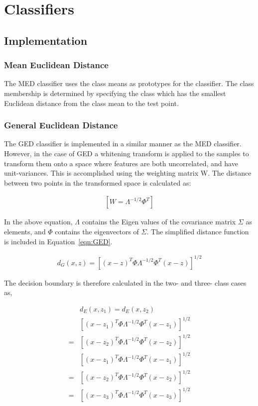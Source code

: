 \section{Classifiers}

\subsection{Implementation}

\subsubsection{Mean Euclidean Distance}

The MED classifier uses the class means as prototypes for the classifier. The class membership is determined by specifying the class which has the smallest Euclidean distance from the class mean to the test point.

\subsubsection{General Euclidean Distance}
The GED classifier is implemented in a similar manner as the MED classifier. However, in the case of GED a whitening transform is applied to the samples to transform them onto a space where features are both uncorrelated, and have unit-variances. This is accomplished using the weighting matrix W. The distance between two points in the transformed space is calculated as:


\begin{eqnarray}
\label{eqn:GED-whitening}
\left [ W=\Lambda^{-1/2}\Phi^{T}  \right ]
\end{eqnarray}



In the above equation, $\Lambda$ contains the Eigen values of the covariance matrix $\Sigma$ as elements, and $\Phi$ contains the eigenvectors of $\Sigma$. The simplified distance function is included in Equation~\ref{eqn:GED}.

\begin{eqnarray}
\label{eqn:GED}
{d}_{G}(x,z) = {\left [ (x-z)^{T}\Phi\Lambda^{-1/2}\Phi^{T}(x-z) \right ]}^{1/2}
\end{eqnarray}


The decision boundary is therefore calculated in the two- and three- class cases as,

\begin{eqnarray}
\label{eqn:boundary-GED}
& d_{E} (x,z_{1}) = d_{E} (x,z_{2}) \\
& \left [ (x-{z}_{1})^{T}\Phi\Lambda^{-1/2}\Phi^{T}(x-z_{1}) \right ]^{1/2} \\
= & \left [ (x-z_{2})^{T}\Phi\Lambda^{-1/2}\Phi^{T}(x-z_{2}) \right ]^{1/2}  \nonumber \\
&\left [ (x-{z}_{1})^{T}\Phi\Lambda^{-1/2}\Phi^{T}(x-z_{1}) \right ]^{1/2} \\
= &\left [ (x-z_{2})^{T}\Phi\Lambda^{-1/2}\Phi^{T}(x-z_{2}) \right ]^{1/2}  \nonumber \\
= &\left [ (x-z_{3})^{T}\Phi\Lambda^{-1/2}\Phi^{T}(x-z_{3}) \right ]^{1/2}  \nonumber
\end{eqnarray}



